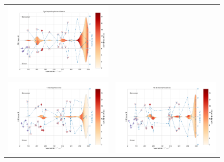 \begin{figure}[H]
\begin{center}
{\begin{tabular}{c c}
							\includegraphics[scale=0.3]{image/P2-18c} & \\ \includegraphics[scale=0.3]{image/P2-18d}&
							\includegraphics[scale=0.3]{image/P2-18e}  \\

\end{tabular}}
\end{center}
\end{figure}
